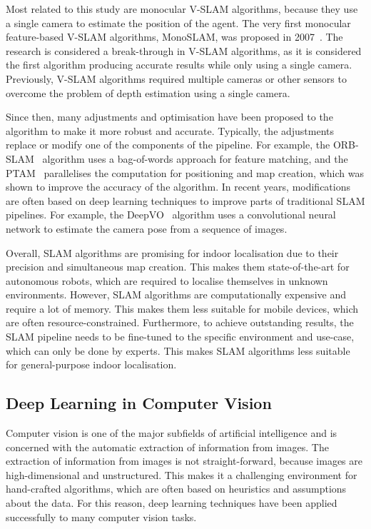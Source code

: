 \documentclass[a4paper]{article}
\begin{document}
Most related to this study are monocular V-SLAM algorithms, because they use a
single camera to estimate the position of the agent. The very first monocular
feature-based V-SLAM algorithms, MonoSLAM, was proposed in
2007~\cite{mono-slam}. The research is considered a break-through in V-SLAM
algorithms, as it is considered the first algorithm producing accurate results
while only using a single camera. Previously, V-SLAM algorithms required
multiple cameras or other sensors to overcome the problem of depth estimation
using a single camera.

Since then, many adjustments and optimisation have been proposed to the
algorithm to make it more robust and accurate. Typically, the adjustments
replace or modify one of the components of the pipeline. For example, the
ORB-SLAM~\cite{orb-slam} algorithm uses a bag-of-words approach for feature
matching, and the PTAM~\cite{ptam} parallelises the computation for
positioning and map creation, which was shown to improve the accuracy of the
algorithm. In recent years, modifications are often based on deep learning
techniques to improve parts of traditional SLAM pipelines. For example, the
DeepVO~\cite{deep-vo} algorithm uses a convolutional neural network to
estimate the camera pose from a sequence of images. 

Overall, SLAM algorithms are promising for indoor localisation due to their
precision and simultaneous map creation. This makes them state-of-the-art for
autonomous robots, which are required to localise themselves in unknown
environments. However, SLAM algorithms are computationally expensive and
require a lot of memory. This makes them less suitable for mobile devices,
which are often resource-constrained. Furthermore, to achieve outstanding
results, the SLAM pipeline needs to be fine-tuned to the specific environment
and use-case, which can only be done by experts. This makes SLAM algorithms
less suitable for general-purpose indoor localisation.


\subsection{Deep Learning in Computer Vision} %

Computer vision is one of the major subfields of artificial intelligence and
is concerned with the automatic extraction of information from images. The
extraction of information from images is not straight-forward, because images
are high-dimensional and unstructured. This makes it a challenging environment
for hand-crafted algorithms, which are often based on heuristics and
assumptions about the data. For this reason, deep learning techniques have
been applied successfully to many computer vision tasks.
\end{document}

